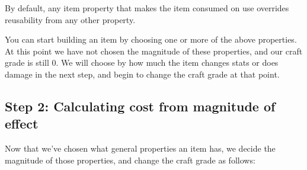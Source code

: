 By default, any item property that makes the item consumed on use overrides reusability from any other property.

You can start building an item by choosing one or more of the above properties. At this point we have not chosen the magnitude of these properties, and our craft grade is still 0. We will choose by how much the item changes stats or does damage in the next step, and begin to change the craft grade at that point.

\subsection{Step 2: Calculating cost from magnitude of effect}
Now that we've chosen what general properties an item has, we decide the magnitude of those properties, and change the craft grade as follows:
